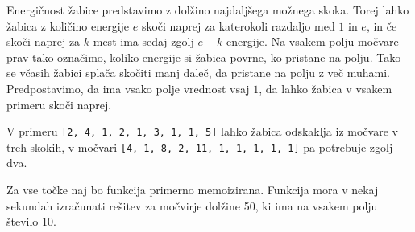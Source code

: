 \documentclass[arhiv]{../izpit}
\begin{document}
Energičnost žabice predstavimo z dolžino najdaljšega možnega skoka. Torej lahko žabica z količino energije $e$ skoči naprej za katerokoli razdaljo med $1$ in $e$, in če skoči naprej za $k$ mest ima sedaj zgolj $e - k$ energije. Na vsakem polju močvare prav tako označimo, koliko energije si žabica povrne, ko pristane na polju. Tako se včasih žabici splača skočiti manj daleč, da pristane na polju z več muhami. Predpostavimo, da ima vsako polje vrednost vsaj $1$, da lahko žabica v vsakem primeru skoči naprej.

V primeru \verb|[2, 4, 1, 2, 1, 3, 1, 1, 5]| lahko žabica odskaklja iz močvare v treh skokih, v močvari \verb|[4, 1, 8, 2, 11, 1, 1, 1, 1, 1]| pa potrebuje zgolj dva. 

Za vse točke naj bo funkcija primerno memoizirana. Funkcija mora v nekaj sekundah izračunati rešitev za močvirje dolžine 50, ki ima na vsakem polju število 10.
\end{document}
